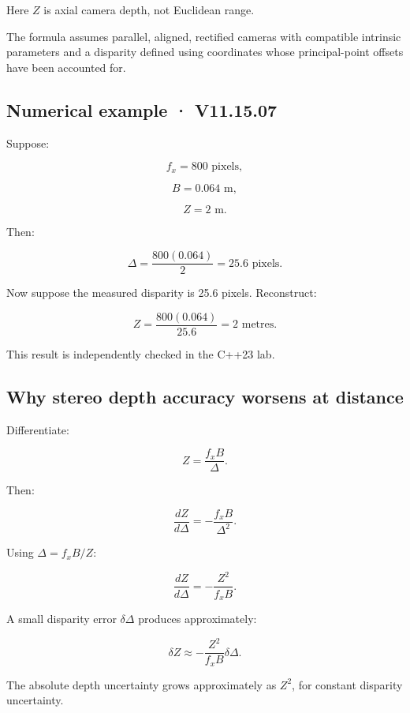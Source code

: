 Here \(Z\) is axial camera depth, not Euclidean range.

The formula assumes parallel, aligned, rectified cameras with compatible intrinsic parameters and a disparity defined using coordinates whose principal-point offsets have been accounted for.

\subsection{Numerical example · V11.15.07}\label{02-foundations-ii-ch035-numerical-example-v11.15.07}

\hypertarget{02-foundations-ii-ch035-numerical-example-v11.15.07}{}

Suppose:

\[ f_x=800\text{ pixels}, \]

\[ B=0.064\text{ m}, \]

\[ Z=2\text{ m}. \]

Then:

\[ \Delta=\frac{800(0.064)}2 =\boxed{25.6\text{ pixels}}. \]

Now suppose the measured disparity is 25.6 pixels. Reconstruct:

\[ Z=\frac{800(0.064)}{25.6} =\boxed{2\text{ metres}}. \]

This result is independently checked in the C++23 lab.

\subsection{Why stereo depth accuracy worsens at distance}\label{02-foundations-ii-ch035-why-stereo-depth-accuracy-worsens-at-distance}

\hypertarget{02-foundations-ii-ch035-why-stereo-depth-accuracy-worsens-at-distance}{}

Differentiate:

\[ Z=\frac{f_xB}{\Delta}. \]

Then:

\[ \frac{dZ}{d\Delta} = -\frac{f_xB}{\Delta^2}. \]

Using \(\Delta=f_xB/Z\):

\[ \boxed{ \frac{dZ}{d\Delta} = -\frac{Z^2}{f_xB}. } \]

A small disparity error \(\delta\Delta\) produces approximately:

\[ \boxed{ \delta Z\approx -\frac{Z^2}{f_xB}\delta\Delta. } \]

The absolute depth uncertainty grows approximately as \(Z^2\), for constant disparity uncertainty.

